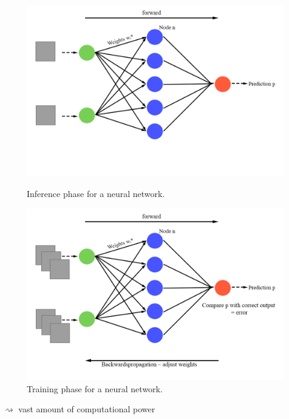 \documentclass[en]{sdqbeamer}
\begin{document}
	\begin{frame}
		\begin{figure}
			\centering
			\begin{minipage}{0.45\paperwidth}
				\centering
				\includegraphics[width=0.45\paperwidth]{pictures/inference.png}
				\caption{Inference phase for a neural network.}
			\end{minipage}\vrule{}
			\begin{minipage}{0.45\paperwidth}
				\centering
				\includegraphics[width=0.45\paperwidth]{pictures/training.png}
				\caption{Training phase for a neural network.}
			\end{minipage}
		\end{figure}
		$\rightsquigarrow$ vast amount of computational power
	\end{frame}
	
\end{document}
